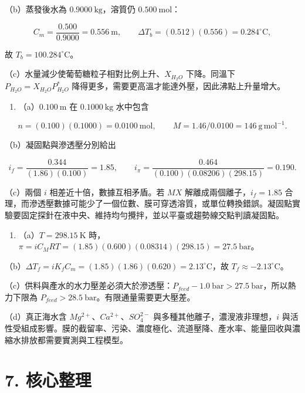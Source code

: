 \documentclass[11pt,a4paper]{article}
\providecommand{\tightlist}{%
  \setlength{\itemsep}{0pt}\setlength{\parskip}{0pt}}
\begin{document}
（b）蒸發後水為 \(0.9000\ \mathrm{kg}\)，溶質仍 \(0.500\ \mathrm{mol}\)：

\[
   C_m=\frac{0.500}{0.9000}=0.556\ \mathrm m,
   \qquad
   \Delta T_b=(0.512)(0.556)=0.284^\circ\mathrm C,
   \]

故 \(T_b=100.284^\circ\mathrm C\)。

（c）水量減少使葡萄糖粒子相對比例上升、\(X_{H_2O}\) 下降。同溫下 \(P_{H_2O}=X_{H_2O}P_{H_2O}^*\) 降得更多，需要更高溫才能達外壓，因此沸點上升量增大。

\begin{enumerate}
\def\labelenumi{\arabic{enumi}.}
\setcounter{enumi}{14}
\tightlist
\item
  （a）\(0.100\ \mathrm m\) 在 \(0.1000\ \mathrm{kg}\) 水中包含
\end{enumerate}

\[
   n=(0.100)(0.1000)=0.0100\ \mathrm{mol},
   \qquad
   M=1.46/0.0100=146\ \mathrm{g\,mol^{-1}}.
   \]

（b）凝固點與滲透壓分別給出

\[
   i_f=\frac{0.344}{(1.86)(0.100)}=1.85,
   \qquad
   i_\pi=\frac{0.464}{(0.100)(0.08206)(298.15)}=0.190.
   \]

（c）兩個 \(i\) 相差近十倍，數據互相矛盾。若 \(MX\) 解離成兩個離子，\(i_f=1.85\) 合理，而滲透壓數據可能少了一個位數、膜可穿透溶質，或單位轉換錯誤。凝固點實驗要固定探針在液中央、維持均勻攪拌，並以平臺或趨勢線交點判讀凝固點。

\begin{enumerate}
\def\labelenumi{\arabic{enumi}.}
\setcounter{enumi}{15}
\tightlist
\item
  （a）\(T=298.15\ \mathrm K\) 時，\(\pi=iC_MRT=(1.85)(0.600)(0.08314)(298.15)=27.5\ \mathrm{bar}\)。
\end{enumerate}

（b）\(\Delta T_f=iK_fC_m=(1.85)(1.86)(0.620)=2.13^\circ\mathrm C\)，故 \(T_f\approx-2.13^\circ\mathrm C\)。

（c）供料與產水的水力壓差必須大於滲透壓：\(P_{feed}-1.0\ \mathrm{bar}>27.5\ \mathrm{bar}\)，所以熱力下限為 \(P_{feed}>28.5\ \mathrm{bar}\)。有限通量需要更大壓差。

（d）真正海水含 \(Mg^{2+}\)、\(Ca^{2+}\)、\(SO_4^{2-}\) 與多種其他離子，濃溲液非理想，\(i\) 與活性受組成影響。膜的截留率、污染、濃度極化、流道壓降、產水率、能量回收與濃縮水排放都需要實測與工程模型。

\section{7. 核心整理}\label{ux6838ux5fc3ux6574ux7406}
\end{document}
